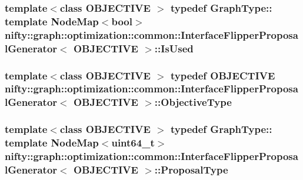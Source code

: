 \subsubsection[{Is\+Used}]{\setlength{\rightskip}{0pt plus 5cm}template$<$class O\+B\+J\+E\+C\+T\+I\+V\+E $>$ typedef Graph\+Type\+:: template Node\+Map$<$bool$>$ {\bf nifty\+::graph\+::optimization\+::common\+::\+Interface\+Flipper\+Proposal\+Generator}$<$ O\+B\+J\+E\+C\+T\+I\+V\+E $>$\+::{\bf Is\+Used}}\label{classnifty_1_1graph_1_1optimization_1_1common_1_1InterfaceFlipperProposalGenerator_a85bf392f7e8524757dd9491344025f3e}
\hypertarget{classnifty_1_1graph_1_1optimization_1_1common_1_1InterfaceFlipperProposalGenerator_a23d9dca49c7acc58fc6ed4d877ccdfd9}{}
\subsubsection[{Objective\+Type}]{\setlength{\rightskip}{0pt plus 5cm}template$<$class O\+B\+J\+E\+C\+T\+I\+V\+E $>$ typedef O\+B\+J\+E\+C\+T\+I\+V\+E {\bf nifty\+::graph\+::optimization\+::common\+::\+Interface\+Flipper\+Proposal\+Generator}$<$ O\+B\+J\+E\+C\+T\+I\+V\+E $>$\+::{\bf Objective\+Type}}\label{classnifty_1_1graph_1_1optimization_1_1common_1_1InterfaceFlipperProposalGenerator_a23d9dca49c7acc58fc6ed4d877ccdfd9}
\hypertarget{classnifty_1_1graph_1_1optimization_1_1common_1_1InterfaceFlipperProposalGenerator_af96c4895cbdc98e624cbece6e15816e1}{}
\subsubsection[{Proposal\+Type}]{\setlength{\rightskip}{0pt plus 5cm}template$<$class O\+B\+J\+E\+C\+T\+I\+V\+E $>$ typedef Graph\+Type\+:: template Node\+Map$<$uint64\+\_\+t$>$ {\bf nifty\+::graph\+::optimization\+::common\+::\+Interface\+Flipper\+Proposal\+Generator}$<$ O\+B\+J\+E\+C\+T\+I\+V\+E $>$\+::{\bf Proposal\+Type}}\label{classnifty_1_1graph_1_1optimization_1_1common_1_1InterfaceFlipperProposalGenerator_af96c4895cbdc98e624cbece6e15816e1}


